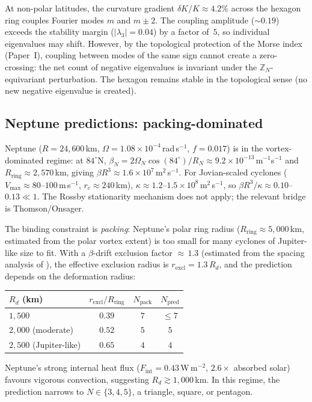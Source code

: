 At non-polar latitudes, the curvature gradient
$\delta K/K \approx 4.2\%$ across the hexagon ring
couples Fourier modes $m$ and $m \pm 2$.
The coupling amplitude ($\sim 0.19$) exceeds the stability
margin ($|\lambda_3| = 0.04$) by a factor of~$5$, so
individual eigenvalues may shift.  However, by the
topological protection of the Morse index (Paper~I),
coupling between modes of the same sign cannot create a
zero-crossing: the net count of negative eigenvalues is
invariant under the $\mathbb{Z}_N$-equivariant perturbation.
The hexagon remains stable in the topological sense
(no new negative eigenvalue is created).

\subsection{Neptune predictions: packing-dominated}
\label{sec:neptune}

Neptune ($R = 24{,}600$\,km, $\Omega = 1.08\times10^{-4}$\,rad\,s$^{-1}$,
$f = 0.017$) is in the vortex-dominated regime:
at $84^\circ$N,
$\beta_N = 2\Omega_N\cos(84^\circ)/R_N
\approx 9.2 \times 10^{-13}$\,m$^{-1}$s$^{-1}$
and $R_{\mathrm{ring}} \approx 2{,}570$\,km, giving
$\beta R^3 \approx 1.6 \times 10^{7}$\,m$^2$\,s$^{-1}$.
For Jovian-scaled cyclones
($V_{\max} \approx 80$--$100$\,m\,s$^{-1}$,
$r_c \approx 240$\,km),
$\kappa \approx 1.2$--$1.5 \times 10^{8}$\,m$^2$\,s$^{-1}$,
so $\beta R^3/\kappa \approx 0.10$--$0.13 \ll 1$.
The Rossby stationarity mechanism does not apply;
the relevant bridge is Thomson/Onsager.

The binding constraint is \emph{packing}: Neptune's polar
ring radius ($R_{\mathrm{ring}} \approx 5{,}000$\,km,
estimated from the polar vortex extent) is too small
for many cyclones of Jupiter-like size to fit.
With a $\beta$-drift exclusion factor ${\approx}\,1.3$
(estimated from the spacing analysis of \citealt{Gavriel2021}),
the effective exclusion radius is
$r_{\mathrm{excl}} = 1.3\,R_d$, and the prediction depends
on the deformation radius:
\begin{center}
\small
\begin{tabular}{lccc}
\toprule
$R_d$ (km) & $r_{\mathrm{excl}}/R_{\mathrm{ring}}$ &
  $N_{\mathrm{pack}}$ & $N_{\mathrm{pred}}$ \\
\midrule
$1{,}500$ & $0.39$ & $7$ & $\le 7$ \\
$2{,}000$ (moderate) & $0.52$ & $5$ & $5$ \\
$2{,}500$ (Jupiter-like) & $0.65$ & $4$ & $4$ \\
\bottomrule
\end{tabular}
\end{center}
Neptune's strong internal heat flux
($F_{\mathrm{int}} = 0.43$\,W\,m$^{-2}$,
$2.6\times$ absorbed solar) favours vigorous convection,
suggesting $R_d \gtrsim 1{,}000$\,km.
In this regime, the prediction narrows to
$N \in \{3, 4, 5\}$, a triangle, square, or pentagon.

